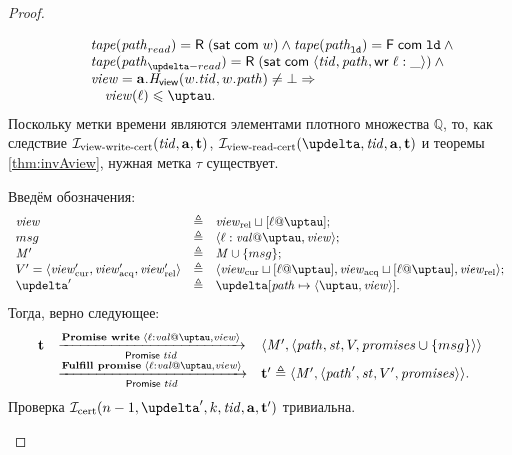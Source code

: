 \begin{proof}
\begin{itemize}
\[\begin{array}{l l}
           & \quad \tape(\cpath_{read}) = \tapeRead{(\tapeSatisfied{\Committed}{\w})} \land
             \tape(\cpath_{\LD}) = \tapeFence{\Committed}{\LD} \land {} \\
           & \quad \tape(\cpath_{\delta-read}) = \tapeRead{(\tapeSatisfied{\Committed}{\stRequestWrite{\tId}{\cpath}\loc}{\_})} \land {} \\
           & \quad \R = \aT.\rmap(\w.\tId, \w.\cpath) \not = \bot \Rightarrow \\
           & \qquad \R(\loc) \le \tau. \\
      \end{array}\]
      Поскольку метки времени являются элементами плотного множества $\mathbb{Q}$, то, как следствие
      $\mathcal{I}_{\textup{\rm view-write-cert}}(\mathit{tid}, \mathbf{a}, \mathbf{t})$, $\invViewReadCERT(\delta, \tId, \aT, \tT)$ и теоремы \ref{thm:invAview},
      нужная метка $\tau$ существует.

      Введём обозначения:
      \[\begin{array}{l l l}
        \R  & \triangleq & \Rrel \sqcup [\loc @ \tau]; \\
        msg & \triangleq & \writeEvt{\loc}{\stval}{\tau}{\R}; \\
        \Mprom' & \triangleq & \Mprom \cup \{msg\};\\
        \V' = \angled{\Rcur', \Racq', \Rrel'} & \triangleq & \angled{\Rcur \sqcup [\loc @ \tau], \Racq \sqcup [\loc @ \tau], \Rrel}; \\
        \delta' & \triangleq & \delta[\cpath \mapsto \angled{\tau, \R}].\\ 
      \end{array}\]
      Тогда, верно следующее:
      \[\begin{array}{l l l}
        \tT & \promTStepPromiseLoc & \angled{\Mprom', \angled{\cpath , \PromState, \V, \PromSet \cup \{msg\}}} \\
            & \promTStepFulfillLoc & \tT' \triangleq \angled{\Mprom', \angled{\cpath', \PromState, \V', \PromSet}}. \\
      \end{array}\]
      Проверка $\invCert(n - 1, \delta', k, \tId, \aT, \tT')$ тривиальна.
          \qedhere
  \end{itemize}
\end{proof}

